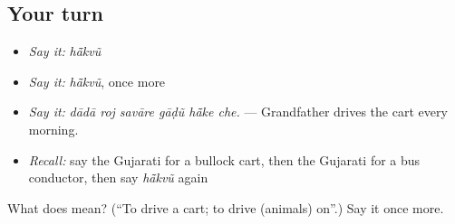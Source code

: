 \subsection*{Your turn}
\begin{itemize}
\raggedright
  \item \emph{Say it:} \emph{hā̃kvũ}
  \item \emph{Say it:} \emph{hā̃kvũ}, once more
  \item \emph{Say it:} \emph{dādā roj savāre gāḍũ hā̃ke che.} — Grandfather drives the cart every morning.
  \item \emph{Recall:} say the Gujarati for a bullock cart, then the Gujarati for a bus conductor, then say \emph{hā̃kvũ} again
\end{itemize}

\begin{tcolorbox}[breakable,colback=teal!4,colframe=teal!35!black,title={Before you move on}]
What does  mean? (\textquotedblleft{}To drive a cart; to drive (animals) on\textquotedblright{}.) Say it once more.
\end{tcolorbox}

